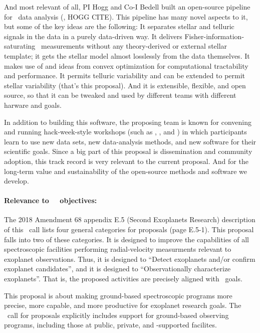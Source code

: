 \documentclass[12pt, letterpaper]{article}
\begin{document}
And most relevant of all, PI Hogg and Co-I Bedell built an open-source
pipeline for \EPRV\ data analysis (\wobble, HOGG CITE).
This pipeline has many novel aspects to it, but some of the key ideas
are the following: 
It separates stellar and telluric signals in the data in a purely
data-driven way.
It delivers Fisher-information-saturating \RV\ measurements without any
theory-derived or external stellar template; it gets the stellar model
almost losslessly from the data themselves.
It makes use of  and ideas from convex optimization
for computational tractability and performance.
It permits telluric variability and can be extended to permit stellar
variability (that's this proposal).
And it is extensible, flexible, and open source, so that it can be
tweaked and used by different teams with different harware and goals.

In addition to building this software, the proposing team is known for
convening and running hack-week-style workshops (such as , , and ) in which participants learn to use new data sets, new
data-analysis methods, and new software for their scientific goals.
Since a big part of this proposal is dissemination and community adoption,
this track record is very relevant to the current proposal.
And for the long-term value and sustainability of the open-source methods
and software we develop.

\paragraph{Relevance to \NASA\ \XRP\ objectives:} The 2018 
Amendment 68 appendix E.5 (Second Exoplanets Research) description of this
\XRP\ call lists four general categories for proposals (page
E.5-1).
This proposal falls into two of these categories.
It is designed to improve the capabilities of all spectroscopic
facilities performing radial-velocity measurments relevant to
exoplanet observations.
Thus, it is designed to ``Detect exoplanets and/or confirm exoplanet
candidates'', and it is designed to ``Observationally characterize
exoplanets''.
That is, the proposed activities are precisely aligned with
\XRP\ goals.

This proposal is about making ground-based spectroscopic programs more
precise, more capable, and more productive for exoplanet research
goals.
The \XRP\ call for proposals explicitly includes support for
ground-based observing programs, including those at public, private,
and \NASA-supported facilites.
\end{document}
